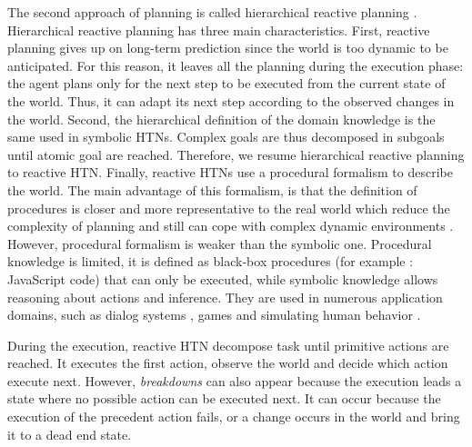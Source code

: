\documentclass[conference]{IEEEtran}
\begin{document}
	\par The second approach of planning is called hierarchical reactive planning \cite{firby1987investigation}. Hierarchical reactive planning has three main characteristics. First, reactive planning gives up on long-term prediction since the world is too dynamic to be anticipated. For this reason, it leaves all the planning during the execution phase: the agent plans only for the next step to be executed from the current  state of the world. Thus, it can adapt its next step according to the observed changes in the world.
	 Second, the hierarchical definition of the domain knowledge is the same used in symbolic HTNs. Complex goals are thus decomposed in subgoals until atomic goal are reached. Therefore, we resume hierarchical reactive planning to reactive HTN. 
	Finally, reactive HTNs use a procedural formalism to describe the world. The main advantage of this formalism, is that the definition of procedures is closer and more representative to the real world which reduce the complexity of planning and still can cope with complex dynamic environments \cite {brom2005hierarchical}. However, procedural formalism is weaker than the symbolic one. Procedural knowledge is limited, it is defined as black-box procedures (for example : JavaScript code) that  can only be executed, while symbolic knowledge allows reasoning about actions and inference. They are used in numerous application domains, such as dialog systems \cite{bohus2003ravenclaw}, games \cite{isla2005handling} and simulating human behavior \cite{brom2005hierarchical}. 
	\par During the execution, reactive HTN decompose task until primitive actions are reached. It executes the first action, observe the world and decide which action execute next. However, \emph{breakdowns} can also appear because the execution leads a state where no possible action can be executed next. It can occur because the execution of the precedent action fails, or a change occurs in the world and bring it to a dead end state. 
	
\end{document}
